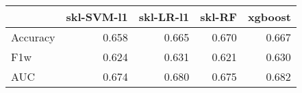 \begin{tabular}{lrrrr}
\toprule
{} &  skl-SVM-l1 &  skl-LR-l1 &  skl-RF &  xgboost \\
\midrule
Accuracy &       0.658 &      0.665 &   0.670 &    0.667 \\
F1w      &       0.624 &      0.631 &   0.621 &    0.630 \\
AUC      &       0.674 &      0.680 &   0.675 &    0.682 \\
\bottomrule
\end{tabular}
